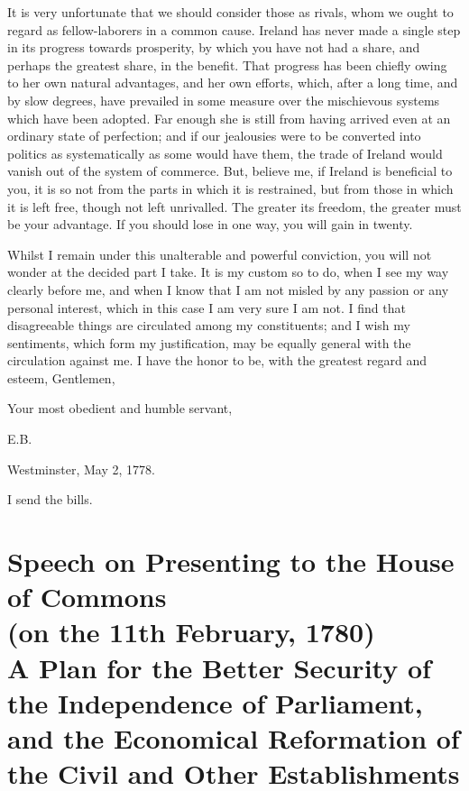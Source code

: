 It is very unfortunate that we should consider those as rivals, whom we ought to regard as fellow-laborers in a common cause. Ireland has never made a single step in its progress towards prosperity, by which you have not had a share, and perhaps the greatest share, in the benefit. That progress has been chiefly owing to her own natural advantages, and her own efforts, which, after a long time, and by slow degrees, have prevailed in some measure over the mischievous systems which have been adopted. Far enough she is still from having arrived even at an ordinary state of perfection; and if our jealousies were to be converted into politics as systematically as some would have them, the trade of Ireland would vanish out of the system of commerce. But, believe me, if Ireland is beneficial to you, it is so not from the parts in which it is restrained, but from those in which it is left free, though not left unrivalled. The greater its freedom, the greater must be your advantage. If you should lose in one way, you will gain in twenty.

Whilst I remain under this unalterable and powerful conviction, you will not wonder at the decided part I take. It is my custom so to do, when I see my way clearly before me, and when I know that I am not misled by any passion or any personal interest, which in this case I am very sure I am not. I find that disagreeable things are circulated among my constituents; and I wish my sentiments, which form my justification, may be equally general with the circulation against me. I have the honor to be, with the greatest regard and esteem, Gentlemen,

\hspace{1.5in} Your most obedient and humble servant,

\hfill E.B.

\noindent
Westminster, May 2, 1778.

I send the bills.




\chapter*[Speech on The Plan for Economical Reform]{
Speech on Presenting to the House of Commons
\\(on the 11th February, 1780)
\\A Plan for the Better Security of the Independence of Parliament, 
and the Economical Reformation of the Civil and Other Establishments}

